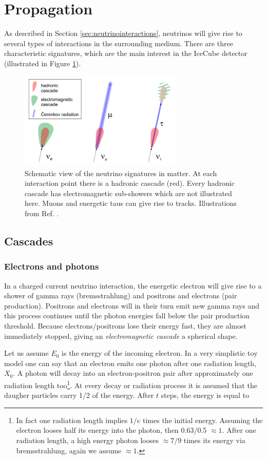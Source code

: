 \section{Propagation}
\label{sec:propagation}
As described in Section \ref{sec:neutrinointeractions}, neutrinos will give rise to several types of interactions in the surrounding medium. There are three characteristic signatures, which are the main interest in the IceCube detector (illustrated in Figure \ref{fig:ICinteractions}).

\begin{figure}[t]
\centering
\includegraphics[width=0.7\textwidth]{chapter4/img/ICinteractions.png}
\caption{Schematic view of the neutrino signatures in matter. At each interaction point there is a hadronic cascade (red). Every hadronic cascade has electromagnetic sub-showers which are not illustrated here. Muons and energetic taus can give rise to tracks. Illustrations from Ref. \cite{Wallraff}.}
\label{fig:ICinteractions}
\end{figure}

\subsection{Cascades}
\subsubsection{Electrons and photons}

In a charged current neutrino interaction, the energetic electron will give rise to a shower of gamma rays (bremsstrahlung) and positrons and electrons (pair production). Positrons and electrons will in their turn emit new gamma rays and this process continues until the photon energies fall below the pair production threshold. Because electrons/positrons lose their energy fast, they are almost immediately stopped, giving an \textit{electromagnetic cascade} a spherical shape.

Let us assume $E_0$ is the energy of the incoming electron. In a very simplistic toy model one can say that an electron emits one photon after one radiation length, $X_0$. A photon will decay into an electron-positron pair after approximately one radiation length too\footnote{In fact one radiation length implies $1/e$ times the initial energy. Assuming the electron looses half its energy into the photon, then 0.63/0.5 $\approx 1$. After one radiation length, a high energy photon looses $\approx 7/9$ times its energy via bremsstrahlung, again we assume $\approx 1$.}. At every decay or radiation process it is assumed that the daugher particles carry 1/2 of the energy. After $t$ steps, the energy is equal to

